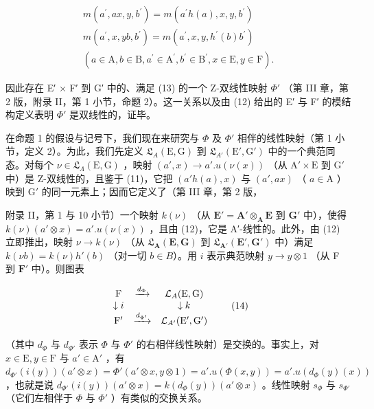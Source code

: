 \[
\begin{array}{r} m (a ^ {\prime}, a x, y, b ^ {\prime}) = m (a ^ {\prime} h (a), x, y, b ^ {\prime}) \\ m (a ^ {\prime}, x, y b, b ^ {\prime}) = m (a ^ {\prime}, x, y, h ^ {\prime} (b) b ^ {\prime}) \\ (a \in \mathrm{A}, b \in \mathrm{B}, a ^ {\prime} \in \mathrm{A} ^ {\prime}, b ^ {\prime} \in \mathrm{B} ^ {\prime}, x \in \mathrm{E}, y \in \mathrm{F}). \end{array}
\]

因此存在 E′ × F′ 到 G′ 中的、满足 (13) 的一个 Z-双线性映射 \(\Phi'\) （第 III 章，第 2 版，附录 II，第 1 小节，命题 2）。这一关系以及由 (12) 给出的 E′ 与 F′ 的模结构定义表明 \(\Phi'\) 是双线性的，证毕。

在命题 1 的假设与记号下，我们现在来研究与 \(\Phi\) 及 \(\Phi'\) 相伴的线性映射（第 1 小节，定义 2）。为此，我们先定义 \(\mathfrak{L}_{A}(\mathrm{E}, \mathrm{G})\) 到 \(\mathfrak{L}_{A'}(\mathrm{E}', \mathrm{G}')\) 中的一个典范同态。对每个 \(\nu \in \mathfrak{L}_{\Lambda}(\mathrm{E}, \mathrm{G})\) ，映射 \((a', x) \to a'. u(\nu(x))\) （从 \(\mathrm{A}' \times \mathrm{E}\) 到 \(\mathrm{G}'\) 中）是 Z-双线性的，且鉴于 (11)，它把 \((a'h(a), x)\) 与 \((a', ax)\) （ \(a \in \mathrm{A}\) ）映到 \(\mathrm{G}'\) 的同一元素上；因而它定义了（第 III 章，第 2 版，

附录 II，第 1 与 10 小节）一个映射 \(k(\nu)\) （从 \(\mathbf{E}' = \mathbf{A}' \otimes_{\mathbf{A}} \mathbf{E}\) 到 \(\mathbf{G}'\) 中），使得 \(k(\nu)(a' \otimes x) = a'. u(\nu(x))\) ，且由 (12)，它是 A′-线性的。此外，由 (12) 立即推出，映射 \(\nu \to k(\nu)\) （从 \(\mathfrak{L}_{\mathbf{A}}(\mathbf{E}, \mathbf{G})\) 到 \(\mathfrak{L}_{\mathbf{A}'}(\mathbf{E}', \mathbf{G}')\) 中）满足 \(k(\nu b) = k(\nu) h'(b)\) （对一切 \(b \in B\)）。用 \(i\) 表示典范映射 \(y \to y \otimes 1\) （从 F 到 \(\mathbf{F}'\) 中）。则图表

\[
\begin{array}{c c c} \mathrm{F} & \xrightarrow {d _ {\Phi}} & \mathcal {L} _ {A} (\mathrm{E}, \mathrm{G}) \\ \downarrow i & & \downarrow k \\ \mathrm{F} ^ {\prime} & \xrightarrow {d _ {\Phi^ {\prime}}} & \mathcal {L} _ {A^{\prime}} (\mathrm{E} ^ {\prime}, \mathrm{G} ^ {\prime}) \end{array}\tag{14}
\]

（其中 \(d_{\Phi}\) 与 \(d_{\Phi'}\) 表示 \(\Phi\) 与 \(\Phi'\) 的右相伴线性映射）是交换的。事实上，对 \(x \in \mathrm{E}, y \in \mathrm{F}\) 与 \(a' \in \mathrm{A}'\) ，有 \(d_{\Phi'}(i(y))(a' \otimes x) = \Phi'(a' \otimes x, y \otimes 1) = a'. u(\Phi(x, y)) = a'. u(d_{\Phi}(y)(x))\) ，也就是说 \(d_{\Phi'}(i(y))(a' \otimes x) = k(d_{\Phi}(y))(a' \otimes x)\) 。线性映射 \(s_{\Phi}\) 与 \(s_{\Phi'}\) （它们左相伴于 \(\Phi\) 与 \(\Phi'\) ）有类似的交换关系。

